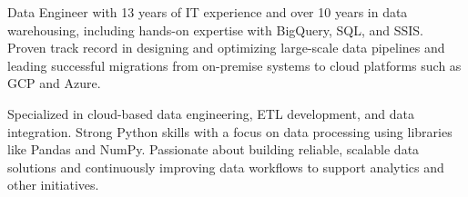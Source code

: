 

\begin{cvparagraph}

Data Engineer with 13 years of IT experience and over 10 years in data warehousing, including hands-on expertise with BigQuery, SQL, and SSIS. Proven track record in designing and optimizing large-scale data pipelines and leading successful migrations from on-premise systems to cloud platforms such as GCP and Azure.

Specialized in cloud-based data engineering, ETL development, and data integration. Strong Python skills with a focus on data processing using libraries like Pandas and NumPy. Passionate about building reliable, scalable data solutions and continuously improving data workflows to support analytics and other initiatives.
\end{cvparagraph}
    

